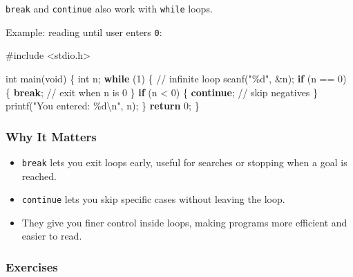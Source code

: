 \documentclass[
  letterpaper,
  DIV=11,
  numbers=noendperiod]{scrreprt}
\newenvironment{Shaded}{\begin{snugshade}}{\end{snugshade}}
\newcommand{\CommentTok}[1]{\textcolor[rgb]{0.37,0.37,0.37}{#1}}
\newcommand{\ControlFlowTok}[1]{\textcolor[rgb]{0.00,0.23,0.31}{\textbf{#1}}}
\newcommand{\DataTypeTok}[1]{\textcolor[rgb]{0.68,0.00,0.00}{#1}}
\newcommand{\DecValTok}[1]{\textcolor[rgb]{0.68,0.00,0.00}{#1}}
\newcommand{\ImportTok}[1]{\textcolor[rgb]{0.00,0.46,0.62}{#1}}
\newcommand{\NormalTok}[1]{\textcolor[rgb]{0.00,0.23,0.31}{#1}}
\newcommand{\OperatorTok}[1]{\textcolor[rgb]{0.37,0.37,0.37}{#1}}
\newcommand{\PreprocessorTok}[1]{\textcolor[rgb]{0.68,0.00,0.00}{#1}}
\newcommand{\SpecialCharTok}[1]{\textcolor[rgb]{0.37,0.37,0.37}{#1}}
\newcommand{\StringTok}[1]{\textcolor[rgb]{0.13,0.47,0.30}{#1}}
\providecommand{\tightlist}{%
  \setlength{\itemsep}{0pt}\setlength{\parskip}{0pt}}
\begin{document}
\texttt{break} and \texttt{continue} also work with \texttt{while}
loops.

Example: reading until user enters \texttt{0}:

\begin{Shaded}
\begin{Highlighting}[]
\PreprocessorTok{\#include }\ImportTok{\textless{}stdio.h\textgreater{}}

\DataTypeTok{int}\NormalTok{ main}\OperatorTok{(}\DataTypeTok{void}\OperatorTok{)} \OperatorTok{\{}
    \DataTypeTok{int}\NormalTok{ n}\OperatorTok{;}
    \ControlFlowTok{while} \OperatorTok{(}\DecValTok{1}\OperatorTok{)} \OperatorTok{\{}         \CommentTok{// infinite loop}
\NormalTok{        scanf}\OperatorTok{(}\StringTok{"}\SpecialCharTok{\%d}\StringTok{"}\OperatorTok{,} \OperatorTok{\&}\NormalTok{n}\OperatorTok{);}
        \ControlFlowTok{if} \OperatorTok{(}\NormalTok{n }\OperatorTok{==} \DecValTok{0}\OperatorTok{)} \OperatorTok{\{}
            \ControlFlowTok{break}\OperatorTok{;}      \CommentTok{// exit when n is 0}
        \OperatorTok{\}}
        \ControlFlowTok{if} \OperatorTok{(}\NormalTok{n }\OperatorTok{\textless{}} \DecValTok{0}\OperatorTok{)} \OperatorTok{\{}
            \ControlFlowTok{continue}\OperatorTok{;}   \CommentTok{// skip negatives}
        \OperatorTok{\}}
\NormalTok{        printf}\OperatorTok{(}\StringTok{"You entered: }\SpecialCharTok{\%d\textbackslash{}n}\StringTok{"}\OperatorTok{,}\NormalTok{ n}\OperatorTok{);}
    \OperatorTok{\}}
    \ControlFlowTok{return} \DecValTok{0}\OperatorTok{;}
\OperatorTok{\}}
\end{Highlighting}
\end{Shaded}

\subsubsection{Why It Matters}\label{why-it-matters-18}

\begin{itemize}
\tightlist
\item
  \texttt{break} lets you exit loops early, useful for searches or
  stopping when a goal is reached.
\item
  \texttt{continue} lets you skip specific cases without leaving the
  loop.
\item
  They give you finer control inside loops, making programs more
  efficient and easier to read.
\end{itemize}

\subsubsection{Exercises}\label{exercises-19}
\end{document}

